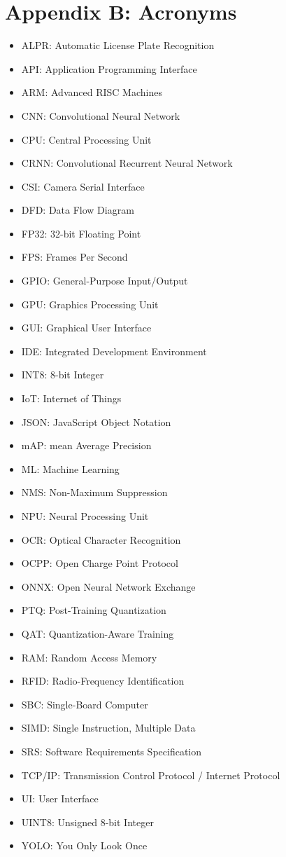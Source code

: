 \section*{Appendix B: Acronyms}
\begin{itemize}
    \item ALPR: Automatic License Plate Recognition
    \item API: Application Programming Interface
    \item ARM: Advanced RISC Machines
    \item CNN: Convolutional Neural Network
    \item CPU: Central Processing Unit
    \item CRNN: Convolutional Recurrent Neural Network
    \item CSI: Camera Serial Interface
    \item DFD: Data Flow Diagram
    \item FP32: 32-bit Floating Point
    \item FPS: Frames Per Second
    \item GPIO: General-Purpose Input/Output
    \item GPU: Graphics Processing Unit
    \item GUI: Graphical User Interface
    \item IDE: Integrated Development Environment
    \item INT8: 8-bit Integer
    \item IoT: Internet of Things
    \item JSON: JavaScript Object Notation
    \item mAP: mean Average Precision
    \item ML: Machine Learning
    \item NMS: Non-Maximum Suppression
    \item NPU: Neural Processing Unit
    \item OCR: Optical Character Recognition
    \item OCPP: Open Charge Point Protocol
    \item ONNX: Open Neural Network Exchange
    \item PTQ: Post-Training Quantization
    \item QAT: Quantization-Aware Training
    \item RAM: Random Access Memory
    \item RFID: Radio-Frequency Identification
    \item SBC: Single-Board Computer
    \item SIMD: Single Instruction, Multiple Data
    \item SRS: Software Requirements Specification
    \item TCP/IP: Transmission Control Protocol / Internet Protocol
    \item UI: User Interface
    \item UINT8: Unsigned 8-bit Integer
    \item YOLO: You Only Look Once
\end{itemize}
